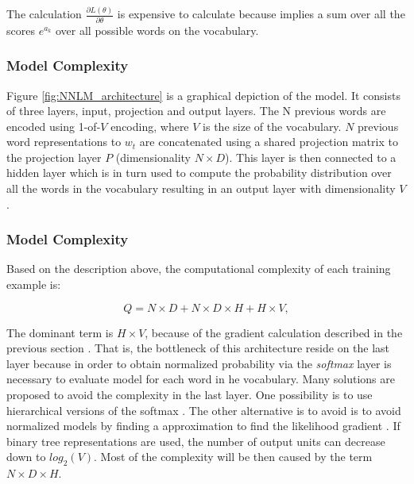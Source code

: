 The calculation  $\frac{\partial L(\theta)}{\partial
  \theta}$ is  expensive to calculate because implies a sum over all the scores $e^{a_{k}}$ over all possible words on the vocabulary.


\subsubsection{Model Complexity}
\label{sec:sub:sub:bengio_nnlm_complexity}

Figure \ref{fig:NNLM_architecture} is a graphical depiction of  the model.
It consists of three layers, input, projection and output layers. The N
previous words are encoded using 1-of-$V$ encoding, where $V$ is the size
of the vocabulary. $N$ previous word representations to $w_t$  are concatenated using a
shared projection matrix to the projection layer $P$ (dimensionality $N
\times D$).  This layer is then connected to a hidden layer which is in turn
used to compute the probability distribution over all the words in the
vocabulary resulting in an output layer with dimensionality $V$.

\subsubsection{Model Complexity}
\label{sec:sub:sub:bengio_nnlm_complexity}
Based on the description above, the computational complexity of each training example is:

\begin{center}
\begin{equation} Q = N \times D + N \times D \times H + H \times V,   \end{equation}
\end{center}

The  dominant term is $H \times V$, because of the gradient calculation
described  in  the previous section \cite{DBLP:journals/corr/abs-1301-3781}. That is, the bottleneck of this architecture reside on the last layer because in order to obtain normalized probability via the \textit{softmax} layer is necessary to evaluate model for each word in he vocabulary.
Many solutions are proposed to avoid the complexity in the last layer. One possibility is to use  hierarchical
versions of the softmax \cite{Morin05hierarchicalprobabilistic,6163930}.
The other alternative is to avoid is to avoid  normalized models by finding
a approximation to find the likelihood gradient \cite{NIPS2013_5165} . If binary tree representations are
used, the number of output units can decrease down to $log_2(V)$. Most
of the complexity will be then caused by the term  $N \times D \times H$.

